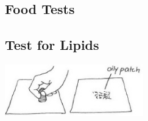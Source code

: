 \begin{multicols}{2}
%
%


\section*{Food Tests} 


\subsection{Test for Lipids} %

\begin{center}
\includegraphics[width=0.45\textwidth]{./img/vso/food-test-lipids.jpg}
\end{center}


\end{multicols}
